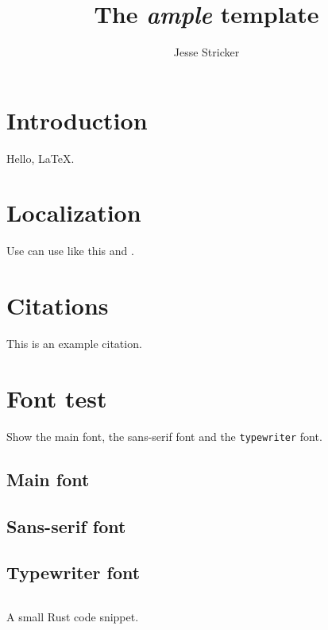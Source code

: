 \documentclass[article,english]{template/ample}
\title{The \emph{ample} template}
\author{Jesse Stricker}
\begin{document}
\maketitle
\tableofcontents


\section{Introduction}

Hello, \LaTeX.

\section{Localization}

Use can use  like this and .

\section{Citations}

This is an example citation\cite{gunn2019}.

\section{Font test}

Show the main font, the \textsf{sans-serif} font and the \texttt{typewriter}
font.

\subsection{Main font}

\blindtext{}

\subsection{Sans-serif font}

{\sffamily\blindtext{}}

\subsection{Typewriter font}

\begin{listing}[H]
  \inputminted{rust}{assets/code-snippet.rs}
  \caption{A small Rust code snippet.\label{lst:small-rust}}
\end{listing}
\end{document}
